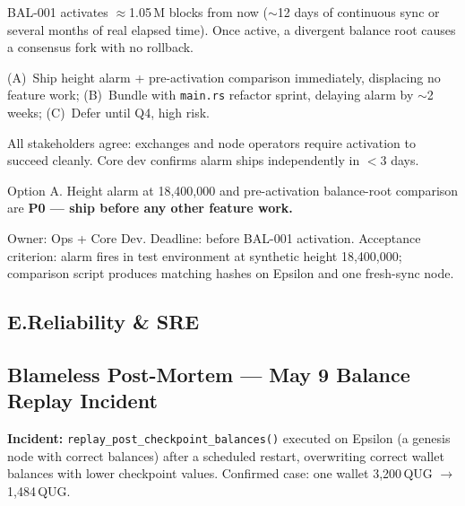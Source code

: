 \documentclass[12pt,a4paper]{article}
\begin{document}
\begin{description}[leftmargin=0pt,itemsep=3pt]
  \item[\textbf{Settings}]
    BAL-001 activates $\approx$1.05\,M blocks from now ($\sim$12 days of
    continuous sync or several months of real elapsed time). Once active, a
    divergent balance root causes a consensus fork with no rollback.

  \item[\textbf{Proposals}]
    (A)~Ship height alarm + pre-activation comparison immediately, displacing
    no feature work; (B)~Bundle with \texttt{main.rs} refactor sprint,
    delaying alarm by $\sim$2 weeks; (C)~Defer until Q4, high risk.

  \item[\textbf{Alignment}]
    All stakeholders agree: exchanges and node operators require activation to
    succeed cleanly. Core dev confirms alarm ships independently in $<$3 days.

  \item[\textbf{Decision}]
    Option A. Height alarm at 18,400,000 and pre-activation balance-root
    comparison are \textbf{P0 --- ship before any other feature work.}

  \item[\textbf{Execution}]
    Owner: Ops + Core Dev. Deadline: before BAL-001 activation.
    Acceptance criterion: alarm fires in test environment at synthetic
    height 18,400,000; comparison script produces matching hashes on
    Epsilon and one fresh-sync node.
\end{description}

\subsection*{E.\enspace Reliability \& SRE}

\subsection{Blameless Post-Mortem --- May 9 Balance Replay Incident}

\textbf{Incident:} \texttt{replay\_post\_checkpoint\_balances()} executed on
Epsilon (a genesis node with correct balances) after a scheduled restart,
overwriting correct wallet balances with lower checkpoint values.
Confirmed case: one wallet 3,200\,QUG $\rightarrow$ 1,484\,QUG.
\end{document}
